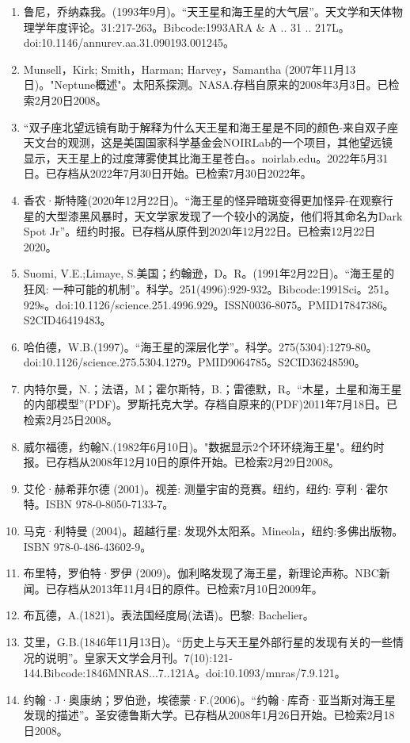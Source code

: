 \begin{enumerate}
\item 鲁尼，乔纳森我。(1993年9月)。“天王星和海王星的大气层”。天文学和天体物理学年度评论。31:217-263。Bibcode:1993ARA & A .. 31 .. 217L。doi:10.1146/annurev.aa.31.090193.001245。
\item Munsell，Kirk; Smith，Harman; Harvey，Samantha (2007年11月13日)。"Neptune概述"。太阳系探测。NASA.存档自原来的2008年3月3日。已检索2月20日2008。
\item “双子座北望远镜有助于解释为什么天王星和海王星是不同的颜色-来自双子座天文台的观测，这是美国国家科学基金会NOIRLab的一个项目，其他望远镜显示，天王星上的过度薄雾使其比海王星苍白。。noirlab.edu。2022年5月31日。已存档从2022年7月30日开始。已检索7月30日2022年。
\item 香农·斯特隆(2020年12月22日)。“海王星的怪异暗斑变得更加怪异-在观察行星的大型漆黑风暴时，天文学家发现了一个较小的涡旋，他们将其命名为Dark Spot Jr”。纽约时报。已存档从原件到2020年12月22日。已检索12月22日2020。
\item Suomi, V.E.;Limaye, S.美国；约翰逊，D。R。(1991年2月22日)。“海王星的狂风: 一种可能的机制”。科学。251(4996):929-932。Bibcode:1991Sci。251。929s。doi:10.1126/science.251.4996.929。ISSN0036-8075。PMID17847386。S2CID46419483。   
\item 哈伯德，W.B.(1997)。“海王星的深层化学”。科学。275(5304):1279-80。doi:10.1126/science.275.5304.1279。PMID9064785。S2CID36248590。  
\item 内特尔曼，N.；法语，M；霍尔斯特，B.；雷德默，R。“木星，土星和海王星的内部模型”(PDF)。罗斯托克大学。存档自原来的(PDF)2011年7月18日。已检索2月25日2008。
\item 威尔福德，约翰N.(1982年6月10日)。"数据显示2个环环绕海王星"。纽约时报。已存档从2008年12月10日的原件开始。已检索2月29日2008。
\item 艾伦·赫希菲尔德 (2001)。视差: 测量宇宙的竞赛。纽约，纽约: 亨利·霍尔特。ISBN  978-0-8050-7133-7。
\item 马克·利特曼 (2004)。超越行星: 发现外太阳系。Mineola，纽约:多佛出版物。ISBN 978-0-486-43602-9。
\item 布里特，罗伯特·罗伊 (2009)。伽利略发现了海王星，新理论声称。NBC新闻。已存档从2013年11月4日的原件。已检索7月10日2009年。
\item 布瓦德，A.(1821)。表法国经度局(法语)。巴黎: Bachelier。
\item 艾里，G.B.(1846年11月13日)。“历史上与天王星外部行星的发现有关的一些情况的说明”。皇家天文学会月刊。7(10):121-144.Bibcode:1846MNRAS...7..121A。doi:10.1093/mnras/7.9.121。
\item 约翰·J·奥康纳；罗伯逊，埃德蒙·F.(2006)。“约翰·库奇·亚当斯对海王星发现的描述”。圣安德鲁斯大学。已存档从2008年1月26日开始。已检索2月18日2008。

\end{enumerate}
